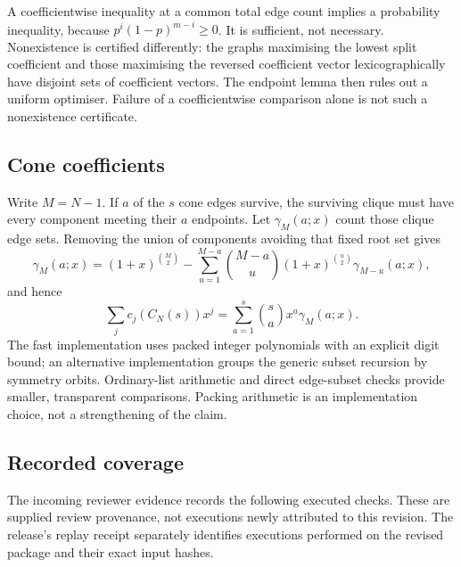 \documentclass[
  11pt,
]{article}
\newcounter{none} %
\theoremstyle{definition}
\theoremstyle{remark}
\begin{document}
A coefficientwise inequality at a common total edge count implies a
probability inequality, because \(p^i(1-p)^{m-i}\ge0\). It is
sufficient, not necessary. Nonexistence is certified differently: the
graphs maximising the lowest split coefficient and those maximising the
reversed coefficient vector lexicographically have disjoint sets of
coefficient vectors. The endpoint lemma then rules out a uniform
optimiser. Failure of a coefficientwise comparison alone is not such a
nonexistence certificate.

\subsection{Cone coefficients}\label{cone-coefficients}

Write \(M=N-1\). If \(a\) of the \(s\) cone edges survive, the surviving
clique must have every component meeting their \(a\) endpoints. Let
\(\gamma_M(a;x)\) count those clique edge sets. Removing the union of
components avoiding that fixed root set gives
\[\gamma_M(a;x)=(1+x)^{\binom M2}
-\sum_{u=1}^{M-a}\binom{M-a}{u}(1+x)^{\binom u2}\gamma_{M-u}(a;x),\] and
hence \[\sum_j c_j(C_N(s))x^j=\sum_{a=1}^s\binom sa x^a\gamma_M(a;x).\]
The fast implementation uses packed integer polynomials with an explicit
digit bound; an alternative implementation groups the generic subset
recursion by symmetry orbits. Ordinary-list arithmetic and direct
edge-subset checks provide smaller, transparent comparisons. Packing
arithmetic is an implementation choice, not a strengthening of the
claim.

\subsection{Recorded coverage}\label{recorded-coverage}

The incoming reviewer evidence records the following executed checks.
These are supplied review provenance, not executions newly attributed to
this revision. The release's replay receipt separately identifies
executions performed on the revised package and their exact input
hashes.
\end{document}
